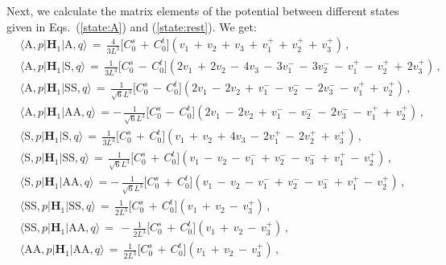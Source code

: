 \documentclass[12pt,prd,tightenlines,nofootinbib]{revtex4-2}
\begin{document}
Next, we calculate the matrix elements of the potential between different
states given in Eqs.~(\ref{state:A}) and (\ref{state:rest}). We get:
\begin{align}\label{eq:H1}
  &\langle\text{A}, p| \textbf{H}_{1} | \text{A},q \rangle\, =\,
  \frac{4}{3L^{3}}\big[ C_{0}^{s}\, +\, C_{0}^{t} \big](v_{1} \, +\, v_{2} \, +\, v_{3} \, +\, v^{+}_{1}\,+\, v^{+}_{2}\,+\, v^{+}_{3})\,,\nonumber\\[2mm]
  &\langle\text{A},p| \textbf{H}_{1} | \text{S},q \rangle\, =\,
   \frac{1}{3L^{3}}\big[ C_{0}^{s}\, -\, C_{0}^{t} \big](2v_{1} \, +\, 2v_{2} \, -\, 4v_{3} \,-\,3v^{-}_{1}\, -\,3v^{-}_{2}\,-\, v^{+}_{1}\,-\, v^{+}_{2}\,+\, 2v^{+}_{3})\,,\nonumber\\[2mm]
   &\langle\text{A},p| \textbf{H}_{1} | \text{SS},q \rangle\, =\,
    \frac{1}{\sqrt{6}L^{3}}\big[ C_{0}^{s}\, -\, C_{0}^{t} \big](2v_{1} \, -\, 2v_{2} \, +\,v^{-}_{1}\, -\,v^{-}_{2}\,-\, 2v^{-}_{3}\,-\, v^{+}_{1}\,+\, v^{+}_{2})\,,\nonumber\\[2mm]
    &\langle\text{A},p| \textbf{H}_{1} | \text{AA},q \rangle\, =
    -\,\frac{1}{\sqrt{6}L^{3}}\big[ C_{0}^{s}\, -\, C_{0}^{t} \big](2v_{1} \, -\, 2v_{2} \, +\,v^{-}_{1}\, -\,v^{-}_{2}\,-\, 2v^{-}_{3}\,-\, v^{+}_{1}\,+\, v^{+}_{2})\,,\nonumber\\[2mm]
    &\langle\text{S},p| \textbf{H}_{1} | \text{S},q \rangle\, =\,
     \frac{1}{3L^{3}}\big[ C_{0}^{s}\, +\, C_{0}^{t} \big](v_{1} \, +\, v_{2} \, +\, 4v_{3} \,-\,2v^{+}_{1}\, -\,2v^{+}_{2}\,+\, v^{+}_{3})\,,\nonumber\\[2mm]
     &\langle \text{S},p| \textbf{H}_{1} | \text{SS},q \rangle\, =\,
      \frac{1}{\sqrt{6}L^{3}}\big[ C_{0}^{s}\, +\, C_{0}^{t} \big](v_{1} \, -\, v_{2} \, -\,v^{-}_{1}\, +\,v^{-}_{2}\,-\, v^{-}_{3}\,+\, v^{+}_{1}\,-\, v^{+}_{2})\,,\nonumber\\[2mm]
      &\langle \text{S},p| \textbf{H}_{1} | \text{AA},q \rangle\, =
      -\,\frac{1}{\sqrt{6}L^{3}}\big[ C_{0}^{s}\, +\, C_{0}^{t} \big](v_{1} \, -\, v_{2} \, -\,v^{-}_{1}\, +\,v^{-}_{2}\,-\, v^{-}_{3}\,+\, v^{+}_{1}\,-\, v^{+}_{2})\,,\nonumber\\[2mm]
      &\langle \text{SS},p| \textbf{H}_{1} | \text{SS},q \rangle\, =\,
       \frac{1}{2L^{3}}\big[ C_{0}^{s}\, +\, C_{0}^{t} \big](v_{1} \, +\, v_{2} \, -\,v^{+}_{3})\,,\nonumber\\[2mm]
       &\langle \text{SS},p| \textbf{H}_{1} | \text{AA},q \rangle\, =\,
       -\frac{1}{2L^{3}}\big[ C_{0}^{s}\, +\, C_{0}^{t} \big](v_{1} \, +\, v_{2} \, -\,v^{+}_{3})\,,\nonumber\\[2mm]
       &\langle\text{AA},p| \textbf{H}_{1} | \text{AA},q \rangle\, =\,
        \frac{1}{2L^{3}}\big[ C_{0}^{s}\, +\, C_{0}^{t} \big](v_{1} \, +\, v_{2} \, -\,v^{+}_{3})\,,
\end{align}
\end{document}
